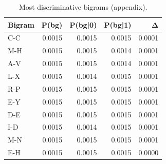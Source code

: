 \begin{table}
\caption{Most discriminative bigrams (appendix).}
\label{tab:top_bigrams}
\begin{tabular}{lrrrr}
\toprule
Bigram & P(bg) & P(bg|0) & P(bg|1) & Δ \\
\midrule
C-C & 0.0015 & 0.0015 & 0.0015 & 0.0001 \\
M-H & 0.0015 & 0.0015 & 0.0014 & 0.0001 \\
A-V & 0.0015 & 0.0015 & 0.0014 & 0.0001 \\
L-X & 0.0015 & 0.0014 & 0.0015 & 0.0001 \\
R-P & 0.0015 & 0.0015 & 0.0015 & 0.0001 \\
E-Y & 0.0015 & 0.0015 & 0.0015 & 0.0001 \\
D-E & 0.0015 & 0.0015 & 0.0015 & 0.0001 \\
I-D & 0.0015 & 0.0014 & 0.0015 & 0.0001 \\
M-N & 0.0015 & 0.0015 & 0.0015 & 0.0001 \\
E-H & 0.0015 & 0.0015 & 0.0015 & 0.0000 \\
\bottomrule
\end{tabular}
\end{table}
